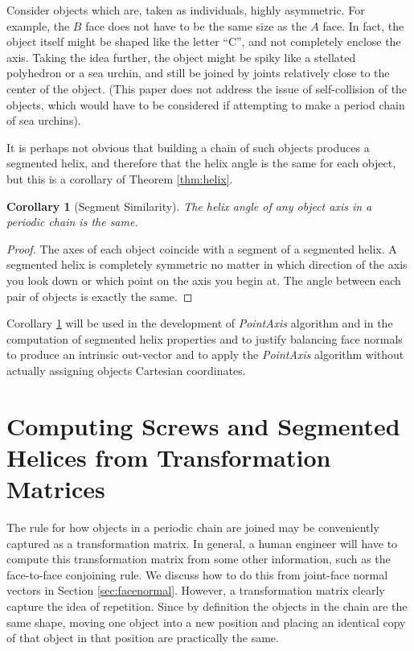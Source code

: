 \documentclass[11pt]{article}
\newtheorem{corollary}{Corollary}
\begin{document}
{Consider
objects which are, taken as individuals, highly asymmetric.
For example,
the $B$ face does not have to be the same size as the $A$ face. In fact,
the object itself might be shaped like the letter ``C'', and not completely
enclose the axis. Taking the idea further, the object might be spiky
like a stellated polyhedron or a sea urchin, and still be joined by
joints relatively close to the center of the object. (This paper does not
address the issue of self-collision of the objects,
which would have to be considered if attempting to make a period chain
of sea urchins).

It is perhaps not obvious that building a chain of such objects
produces a segmented helix, and therefore that the helix angle is the
same for each object, but this is a corollary of Theorem \ref{thm:helix}.


\begin{corollary}[Segment Similarity]
  The helix angle of any object axis in a periodic chain is the same.
  \label{cor:symmetric}
\end{corollary}

\begin{proof}
  The axes of each object coincide with a segment of a segmented helix.
  A segmented helix is completely symmetric no matter in which direction
  of the axis you look down or which point on the axis you begin at. The angle between each pair of objects
  is exactly the same.
\end{proof}

Corollary \ref{cor:symmetric} will be used in the development of {\em PointAxis} algorithm
and in the computation of segmented helix properties and to justify balancing face normals
to produce an intrinsic out-vector and to apply the {\em PointAxis} algorithm
without actually assigning objects Cartesian coordinates.

\section{Computing Screws and Segmented Helices from Transformation Matrices}
\label{sec:screws}

The rule for how objects in a periodic chain are joined may be
conveniently captured as a transformation
matrix.
In general, a human engineer will have to compute this transformation matrix from some other
information, such as the face-to-face conjoining rule.
We discuss how to do this from joint-face normal
vectors in Section \ref{sec:facenormal}. However, a transformation matrix clearly
capture the idea of repetition.
Since by definition the objects in the chain are the same shape,
moving one object into a new position and placing an identical copy of that object in that position
are practically the same.

}
\end{document}
